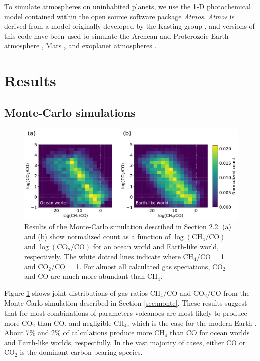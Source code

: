 To simulate atmospheres on uninhabited planets, we use the 1-D photochemical model contained within the open source software package \textit{Atmos}. \textit{Atmos} is derived from a model originally developed by the Kasting group \citep{Pavlov_2001}, and versions of this code have been used to simulate the Archean and Proterozoic Earth atmosphere \citep{Zahnle_2006}, Mars \citep{Sholes_2019,Smith_2014,Zahnle_2008}, and exoplanet atmospheres \citep{Harman_2015,Schwieterman_2019}. 

\section{Results}

\subsection{Monte-Carlo simulations}
\begin{figure}
  \centering
  \includegraphics[width=\textwidth]{tex/3methane/figures/both.pdf}
  \caption{Results of the Monte-Carlo simulation described in Section 2.2. (a) and (b) show normalized count as a function of $\log(\mathrm{CH_4/CO})$ and $\log(\mathrm{CO_2/CO})$ for an ocean world and Earth-like world, respectively. The white dotted lines indicate where CH$_4$/CO = 1 and CO$_2$/CO = 1. For almost all calculated gas speciations, CO$_2$ and CO are much more abundant than CH$_4$.}
  \label{fig:result1}
\end{figure}

Figure \ref{fig:result1} shows joint distributions of gas ratios CH$_4$/CO and CO$_2$/CO from the Monte-Carlo simulation described in Section \ref{sec:monte}. These results suggest that for most combinations of parameters volcanoes are most likely to produce more CO$_2$ than CO, and negligible CH$_4$, which is the case for the modern Earth \citep{Catling_2017}. About 7\% and 2\% of calculations produce more CH$_4$ than CO for ocean worlds and Earth-like worlds, respectfully. In the vast majority of cases, either CO or CO$_2$ is the dominant carbon-bearing species.

